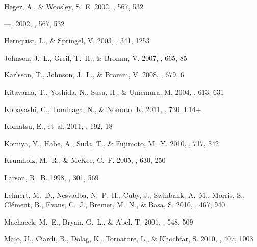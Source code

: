 \documentclass[apj]{emulateapj}
\begin{document}
\begin{thebibliography}{108}
{Heger}, A., \& {Woosley}, S.~E. 2002{}, \apj, 567, 532

---. 2002{}, \apj, 567, 532

{Hernquist}, L., \& {Springel}, V. 2003, \mnras, 341, 1253

{Johnson}, J.~L., {Greif}, T.~H., \& {Bromm}, V. 2007, \apj, 665, 85

{Karlsson}, T., {Johnson}, J.~L., \& {Bromm}, V. 2008, \apj, 679, 6

{Kitayama}, T., {Yoshida}, N., {Susa}, H., \& {Umemura}, M. 2004, \apj, 613,
  631

{Kobayashi}, C., {Tominaga}, N., \& {Nomoto}, K. 2011, \apjl, 730, L14+

{Komatsu}, E., {et~al.} 2011, \apjs, 192, 18

{Komiya}, Y., {Habe}, A., {Suda}, T., \& {Fujimoto}, M.~Y. 2010, \apj, 717, 542

{Krumholz}, M.~R., \& {McKee}, C.~F. 2005, \apj, 630, 250

{Larson}, R.~B. 1998, \mnras, 301, 569

{Lehnert}, M.~D., {Nesvadba}, N.~P.~H., {Cuby}, J., {Swinbank}, A.~M.,
  {Morris}, S., {Cl{\'e}ment}, B., {Evans}, C.~J., {Bremer}, M.~N., \& {Basa},
  S. 2010, \nat, 467, 940

{Machacek}, M.~E., {Bryan}, G.~L., \& {Abel}, T. 2001, \apj, 548, 509

{Maio}, U., {Ciardi}, B., {Dolag}, K., {Tornatore}, L., \& {Khochfar}, S. 2010,
  \mnras, 407, 1003


\end{thebibliography}
\end{document}
